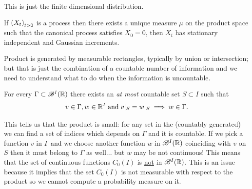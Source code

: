 \documentclass[12pt]{report}
\begin{document}
This is just the finite dimensional \bwm{} distribution.
\begin{corollary}
	If ${\left({X}_{t}\right)}_{t>0}$ is a process then there exists a unique measure $\mu$ on the product space such that the canonical process satisfies $X_{0}=0$, then $X_{t}$ has stationary independent and Gaussian increments.
\end{corollary}
Product \sa{} is generated by measurable rectangles, typically by union or intersection; but that is just the combination of a countable number of information and we need to understand what to do when the information is uncountable.
\begin{theorem}
	For every $\Gamma\subset \mathscr{B}^{I}(\mathbb{R})$ there exists an \textit{at most} countable set $S\subset I$ such that 
	\begin{equation*}
		v\in\Gamma,w\in\mathbb{R}^{I}\;\text{and}\;v|_{S}=w|_{S}\implies w\in\Gamma.
	\end{equation*}
\end{theorem}
This tells us that the product \sa{} is small: for any set in the \sa{} (countably generated) we can find a set of indices which depends on $\Gamma$ and it is countable. If we pick a function  $v$ in $\Gamma$ and we choose another function $w$ in $\mathscr{B}^{I}(\mathbb{R})$ coinciding with $v$ on $S$ then it must belong to $\Gamma$ as well... but $w$ may be not continuous! This means that the set of continuous functions $C_{0}(I)$ is \underline{not} in $\mathscr{B}^{I}(\mathbb{R})$. This is an issue because it implies that the set $C_{0}(I)$ is not measurable with respect to the product \sa{} so we cannot compute a probability measure on it.
\end{document}
